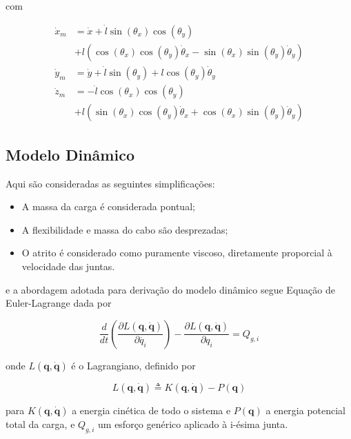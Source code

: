 \documentclass{ppgeesa}
\begin{document}
com 

\begin{align}
\dot{x}_m &= \dot{x}+\dot{l}\sin(\theta_x)\cos(\theta_y)\nonumber\\
    &+ l\left(\cos(\theta_x)\cos(\theta_y)\dot{\theta}_x-\sin(\theta_x)\sin(\theta_y)\dot{\theta}_y\right)\\
\dot{y}_m &= \dot{y} + \dot{l}\sin(\theta_y) + l\cos(\theta_y)\dot{\theta}_y\\
\dot{z}_m &= -\dot{l}\cos(\theta_x)\cos(\theta_y)\nonumber\\
    &+ l\left(\sin(\theta_x)\cos(\theta_y)\dot{\theta}_x+\cos(\theta_x)\sin(\theta_y)\dot{\theta}_y\right)
\label{eq:direct_kinematics}
\end{align}

\subsection{Modelo Dinâmico}

Aqui são consideradas as seguintes simplificações:

\begin{itemize}
  \item A massa da carga é considerada pontual;
  \item A flexibilidade e massa do cabo são desprezadas;
  \item O atrito é considerado como puramente viscoso, diretamente proporcial à velocidade das juntas. 
\end{itemize}

\noindent e a abordagem adotada para derivação do modelo dinâmico segue Equação de Euler-Lagrange dada por

\begin{equation}
  \frac{d}{dt}\left(\frac{\partial L(\mathbf{q}, \dot{\mathbf{q}})}{\partial \dot{q_i}}\right) - \frac{\partial L(\mathbf{q}, \dot{\mathbf{q}})}{\partial q_i} = Q_{g,i}
\end{equation}

\noindent onde $L(\mathbf{q}, \dot{\mathbf{q}})$ é o Lagrangiano, definido por

\begin{equation}
  L(\mathbf{q}, \dot{\mathbf{q}}) \triangleq K(\mathbf{q}, \dot{\mathbf{q}}) - P(\mathbf{q})\label{eq:lagrangian}
\end{equation}

\noindent para $K(\mathbf{q}, \dot{\mathbf{q}})$ a energia cinética de todo o sistema e $P(\mathbf{q})$ a energia potencial total da carga, e $Q_{g,i}$ um esforço genérico aplicado à i-ésima junta.
\end{document}
